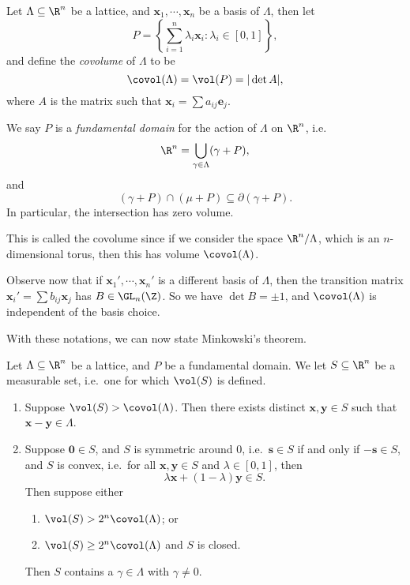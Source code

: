 \documentclass[a4paper]{article}
\begin{document}
\begin{defi}
  Let $\Lambda \subseteq \R^n$ be a lattice, and $\mathbf{x}_1, \cdots, \mathbf{x}_n$ be a basis of $\Lambda$, then let
  \[
    P = \left\{\sum_{i = 1}^n \lambda_i \mathbf{x}_i: \lambda_i \in [0, 1]\right\},
  \]
  and define the \emph{covolume} of $\Lambda$ to be
  \[
    \covol(\Lambda) = \vol(P) = |\det A|,
  \]
  where $A$ is the matrix such that $\mathbf{x}_i = \sum a_{ij} \mathbf{e}_j$.

  We say $P$ is a \emph{fundamental domain} for the action of $\Lambda$ on $\R^n$, i.e.
  \[
    \R^n = \bigcup_{\gamma \in \Lambda} (\gamma + P),
  \]
  and
  \[
    (\gamma + P) \cap (\mu + P) \subseteq \partial (\gamma + P).
  \]
  In particular, the intersection has zero volume.
\end{defi}
This is called the covolume since if we consider the space $\R^n/ \Lambda$, which is an $n$-dimensional torus, then this has volume $\covol (\Lambda)$.

Observe now that if $\mathbf{x}_1', \cdots, \mathbf{x}_n'$ is a different basis of $\Lambda$, then the transition matrix $\mathbf{x}_i' = \sum b_{ij} \mathbf{x}_j$ has $B \in \GL_n (\Z)$. So we have $\det B = \pm 1$, and $\covol (\Lambda)$ is independent of the basis choice.

With these notations, we can now state Minkowski's theorem.

\begin{thm}
  Let $\Lambda \subseteq \R^n$ be a lattice, and $P$ be a fundamental domain. We let $S \subseteq \R^n$ be a measurable set, i.e.\ one for which $\vol(S)$ is defined.
  \begin{enumerate}
    \item Suppose $\vol(S) > \covol(\Lambda)$. Then there exists distinct $\mathbf{x}, \mathbf{y} \in S$ such that $\mathbf{x} - \mathbf{y} \in \Lambda$.
    \item Suppose $\mathbf{0} \in S$, and $S$ is symmetric around $0$, i.e.\ $\mathbf{s} \in S$ if and only if $-\mathbf{s} \in S$, and $S$ is convex, i.e.\ for all $\mathbf{x}, \mathbf{y} \in S$ and $\lambda \in [0, 1]$, then
      \[
        \lambda \mathbf{x} + (1 - \lambda)\mathbf{y} \in S.
      \]
      Then suppose either
      \begin{enumerate}
        \item $\vol (S) > 2^n \covol(\Lambda)$; or
        \item $\vol (S) \geq 2^n \covol(\Lambda)$ and $S$ is closed.
      \end{enumerate}
      Then $S$ contains a $\gamma \in \Lambda$ with $\gamma \not= 0$.
  \end{enumerate}
\end{thm}
\end{document}
